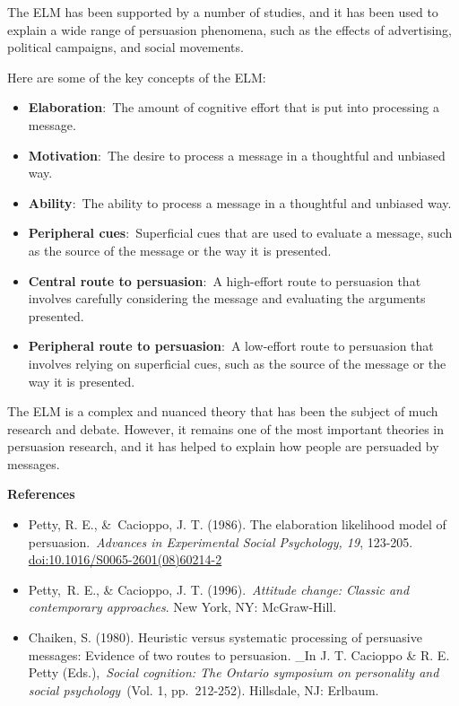 \documentclass[
  b5paper]{book}
\begin{document}
The ELM has been supported by a number of studies, and it has been used to explain a wide range of persuasion phenomena, such as the effects of advertising, political campaigns, and social movements.

Here are some of the key concepts of the ELM:

\begin{itemize}
\item
  \textbf{Elaboration}:~The amount of cognitive effort that is put into processing a message.
\item
  \textbf{Motivation}:~The desire to process a message in a thoughtful and unbiased way.
\item
  \textbf{Ability}:~The ability to process a message in a thoughtful and unbiased way.
\item
  \textbf{Peripheral cues}:~Superficial cues that are used to evaluate a message, such as the source of the message or the way it is presented.
\item
  \textbf{Central route to persuasion}:~A high-effort route to persuasion that involves carefully considering the message and evaluating the arguments presented.
\item
  \textbf{Peripheral route to persuasion}:~A low-effort route to persuasion that involves relying on superficial cues, such as the source of the message or the way it is presented.
\end{itemize}

The ELM is a complex and nuanced theory that has been the subject of much research and debate. However, it remains one of the most important theories in persuasion research, and it has helped to explain how people are persuaded by messages.

\textbf{References}

\begin{itemize}
\item
  Petty, R. E., \&~Cacioppo, J. T. (1986). The elaboration likelihood model of persuasion.~\emph{Advances in Experimental Social Psychology, 19}, 123-205. \url{doi:10.1016/S0065-2601(08)60214-2}
\item
  Petty,~R. E., \& Cacioppo, J. T. (1996).~\emph{Attitude change: Classic and contemporary approaches}. New York, NY: McGraw-Hill.
\item
  Chaiken, S. (1980). Heuristic versus systematic processing of persuasive messages: Evidence of two routes to persuasion. \_In J. T. Cacioppo \& R. E. Petty (Eds.),~\emph{Social cognition: The Ontario symposium on personality and social psychology}~(Vol. 1, pp.~212-252). Hillsdale, NJ: Erlbaum.
\end{itemize}
\end{document}
